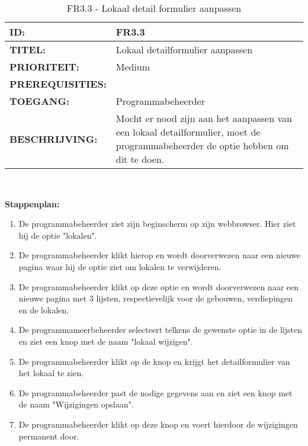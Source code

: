 \noindent\begin{table}[H]
            \begin{tabular}{l | p{10cm}}
                \textbf{ID:} & FR3.3 \\ \hline
                \textbf{TITEL:} & Lokaal detailformulier aanpassen\\ \hline
                \textbf{PRIORITEIT:} &  Medium \\ \hline
                \textbf{PREREQUISITIES:} & \\ \hline
                \textbf{TOEGANG:} & Programmabeheerder \\ \hline
                \textbf{BESCHRIJVING:} & Mocht er nood zijn aan het aanpassen van een lokaal detailformulier, moet de programmabeheerder de optie hebben om dit te doen.\\ 
            \end{tabular}\\
            \caption{FR3.3 - Lokaal detail formulier aanpassen}
            \label{tab:FR3.3 - Lokaal detailformulier aanpassen}
        \end{table}
        
\textbf{Stappenplan:}
\begin{enumerate}
\item De programmabeheerder ziet zijn beginscherm op zijn webbrowser. Hier ziet hij de optie "lokalen".
\item De programmabeheerder klikt hierop en wordt doorverwezen naar een nieuwe pagina waar hij de optie ziet om lokalen te verwijderen.
\item De programmabeheerder klikt op deze optie en wordt doorverwezen naar een nieuwe pagina met 3 lijsten, respectievelijk voor de gebouwen, verdiepingen en de lokalen.
\item De programmameerbeheerder selecteert telkens de gewenste optie in de lijsten en ziet een knop met de naam "lokaal wijzigen".
\item De programmabeheerder klikt op de knop en krijgt het detailformulier van het lokaal te zien.
\item De programmabeheerder past de nodige gegevens aan en ziet een knop met de naam "Wijzigingen opslaan".
\item De programmabeheerder klikt op deze knop en voert hierdoor de wijzigingen permanent door.
\end{enumerate}
\clearpage